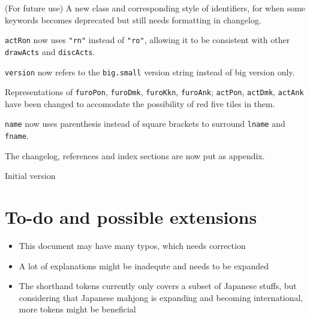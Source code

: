\documentclass[%
	a4paper%
	,10pt%
	,twoside%
	,notitlepage%
]{article}%
\renewcommand*{\DTMdisplaydate}[4]{%
		\ifnum##4>-1{\DTMenglishshortweekdayname{##4}\space}\fi%
		\DTMtwodigits{##3}\space%
		\DTMenglishshortmonthname{##2}\space%
		##1%
	}%
\newcommand*{\github}[1]{\texorpdfstring{\href{https://github.com/#1}{\texttt{#1}}}{#1}}%
\begin{document}
\begin{changelog}[%
	section=true%
	,sectioncmd={\section}%
	,title={Changelog}%
	,label={sec:changelog}%
]
\begin{version}[%
		version=1.0.0-β%
		,author={\github{ChemistMikeLam}}%
		,date=Unreleased%
	]
			\item{}(For future use) A new class and corresponding style of identifiers, for when some keywords becomes deprecated but still needs formatting in changelog. %
		\changed{}%
			\item{}\lstinline/actRon/ now uses \lstinline/"rn"/ instead of \lstinline/"ro"/, allowing it to be consistent with other \lstinline/drawActs/ and \lstinline/discActs/. %
			\item{}\lstinline/version/ now refers to the \texttt{big.small} version string instead of big version only. %
			\item{}Representations of \lstinline/furoPon/, \lstinline/furoDmk/, \lstinline/furoKkn/, \lstinline/furoAnk/; \lstinline/actPon/, \lstinline/actDmk/, \lstinline/actAnk/ have been changed to accomodate the possibility of red five tiles in them. %
			\item{}\lstinline/name/ now uses parenthesis instead of square brackets to surround \lstinline/lname/ and \lstinline/fname/. %
			\item{}The changelog, references and index sections are now put as appendix. %
	\end{version}%
	\begin{version}[%
		version=0.0.0%
		,author={\github{ChemistMikeLam}}%
		,date={\DTMdisplaydate{2020}{06}{23}{1}}%
		,simple=true%
	]%
		\item{}Initial version%
	\end{version}%
\end{changelog}%
% 
\section{To-do and possible extensions}%
% 
	\begin{itemize}%
		\item{}This document may have many typos, which needs correction%
		\item{}A lot of explanations might be inadequte and needs to be expanded%
		\item{}The shorthand tokens currently only covers a subset of Japanese stuffs, but considering that Japanese mahjong is expanding and becoming international, more tokens might be beneficial%
	\end{itemize}%
% 
% 
% 
\printindex{}%
% 
\end{document}
